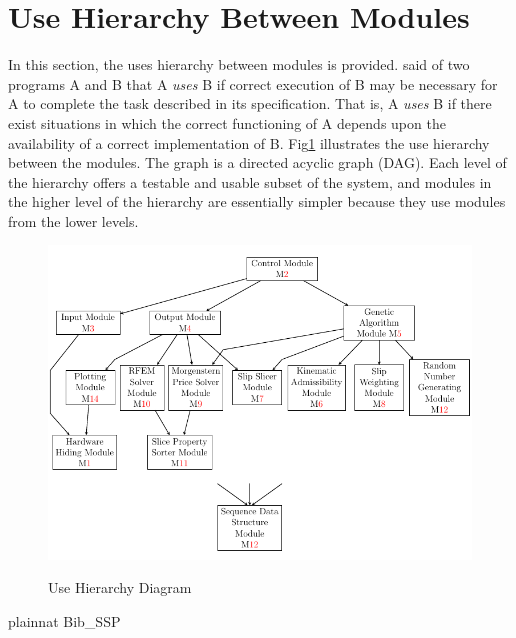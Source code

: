 \documentclass[12pt]{article}
\newcounter{fnum}
\newcommand{\fref}[1]{Fig\ref{#1}}
\begin{document}
\section{Use Hierarchy Between Modules} \label{SecUse}

\hspace{3ex}In this section, the uses hierarchy between modules is
provided. \cite{Parnas1978} said of two programs A and B that A {\em
  uses} B if correct execution of B may be necessary for A to complete
the task described in its specification. That is, A {\em uses} B if
there exist situations in which the correct functioning of A depends
upon the availability of a correct implementation of B. 
\fref{Fig_Use} illustrates the use hierarchy between the modules. The
graph is a directed acyclic graph (DAG). Each level of the hierarchy
offers a testable and usable subset of the system, and modules in the
higher level of the hierarchy are essentially simpler because they use
modules from the lower levels.

\begin{figure}[h!]   \label{Fig_Use}
\begin{center}
{
 \includegraphics[width=1.1\textwidth]{UseHierarchyDiagram3.png}
}
\caption{Use Hierarchy Diagram}
\end{center}
\end{figure}

 {plainnat}
 {Bib_SSP}
\end{document}
